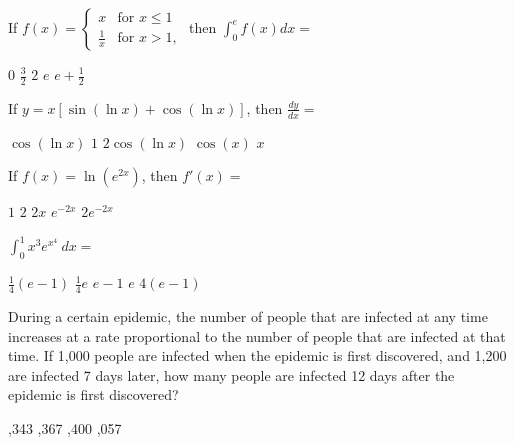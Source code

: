 \begin{questions}
\question[2] If $f(x) = \left\{ \begin{array}{lr} x & \mbox{for } x \le
    1 \\ \frac{1}{x} & \mbox{for } x > 1, \end{array} \right.$ then $\int_0^e
    f(x)dx = $

    \begin{oneparchoices}
    \choice $0$
    \CorrectChoice $\frac{3}{2}$
    \choice $2$
    \choice $e$
    \choice $e + \frac{1}{2}$
    \end{oneparchoices}

\question[2]  If $y = x[\sin (\ln x) + \cos (\ln x)]$, then
    $\frac{dy}{dx} = $

    \begin{oneparchoices}
    \choice $\cos (\ln x)$
    \choice $1$
    \CorrectChoice $2 \cos(\ln x)$
    \choice $\cos (x)$
    \choice $x$
    \end{oneparchoices}

\question[2] If $f(x) = \ln(e^{2x})$, then $f'(x) = $

    \begin{oneparchoices}
    \choice $1$
    \CorrectChoice $2$
    \choice $2x$
    \choice $e^{-2x}$
    \choice $2e^{-2x}$
    \end{oneparchoices}

\question[2] $\int_0^1 x^3e^{x^4}\ dx =$

    \begin{oneparchoices}
    \CorrectChoice $\frac{1}{4}(e - 1)$
    \choice $\frac{1}{4}e$
    \choice $e - 1$
    \choice $e$
    \choice $4(e - 1)$
    \end{oneparchoices}

\question[2] During a certain epidemic, the number of people that are
    infected at any time increases at a rate proportional to the
    number of people that are infected at that time. If 1,000 people
    are infected when the epidemic is first discovered, and 1,200 are
    infected 7 days later, how many people are infected 12 days after
    the epidemic is first discovered?

    \begin{oneparchoices}
    ,343
    ,367
    ,400
    ,057
    \end{oneparchoices}


\end{questions}
